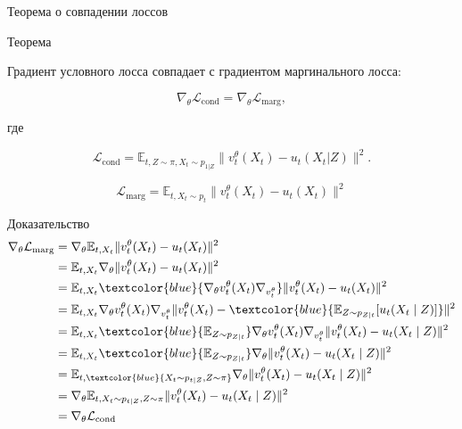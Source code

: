 \documentclass{beamer}
\begin{document}
\begin{frame}{Теорема о совпадении лоссов}

\begin{block}{Теорема}

Градиент условного лосса совпадает
с градиентом маргинального лосса:

\[
\nabla_\theta \mathcal L_{\text{cond}}
=
\nabla_\theta \mathcal L_{\text{marg}},
\]

где

\[
\mathcal L_{\text{cond}} =
\mathbb E_{t,Z \sim \pi, X_t \sim p_{1 | Z}}
\| v_t^\theta(X_t) - u_t(X_t|Z) \|^2.
\]

\[
\mathcal L_{\text{marg}}
=
\mathbb E_{t, X_t \sim p_t}
\| v_t^\theta(X_t) - u_t(X_t) \|^2
\]

\end{block}

\end{frame}

\begin{frame}{Доказательство}
    \begin{align*}
        \nabla_\theta \mathcal L_{\text{marg}} 
        & = \nabla_\theta \mathbb{E}_{t,X_t} \| v_t^\theta(X_t) - u_t(X_t) \|^2 \\
        & = \mathbb{E}_{t,X_t} \nabla_\theta \| v_t^\theta(X_t) - u_t(X_t) \|^2 \\
        & = \mathbb{E}_{t,X_t} \textcolor{blue}{\nabla_\theta v_t^\theta(X_t) \nabla_{v_t^\theta}} \| v_t^\theta(X_t) - u_t(X_t) \|^2 \\
        & = \mathbb{E}_{t,X_t} \nabla_\theta v_t^\theta(X_t) \nabla_{v_t^\theta} \| v_t^\theta(X_t) - \textcolor{blue}{\mathbb{E}_{Z \sim p_{Z | t}} [ u_t(X_t \mid Z)]} \|^2 \\
        & = \mathbb{E}_{t,X_t} \textcolor{blue}{\mathbb{E}_{Z \sim p_{Z | t}}} \nabla_\theta v_t^\theta(X_t) \nabla_{v_t^\theta} \| v_t^\theta(X_t) - u_t(X_t \mid Z) \|^2 \\
        & = \mathbb{E}_{t,X_t} \textcolor{blue}{\mathbb{E}_{Z \sim p_{Z | t}}} \nabla_\theta \| v_t^\theta(X_t) - u_t(X_t \mid Z) \|^2 \\
        & = \mathbb{E}_{t, \textcolor{blue}{X_t \sim p_{t|Z}, Z \sim \pi}} \nabla_\theta \| v_t^\theta(X_t) - u_t(X_t \mid Z) \|^2 \\
        & = \nabla_\theta \mathbb{E}_{t, X_t \sim p_{t|Z}, Z \sim \pi} \| v_t^\theta(X_t) - u_t(X_t \mid Z) \|^2 \\
        & = \nabla_\theta \mathcal{L}_{\text{cond}} 
    \end{align*}

\end{frame}
\end{document}
